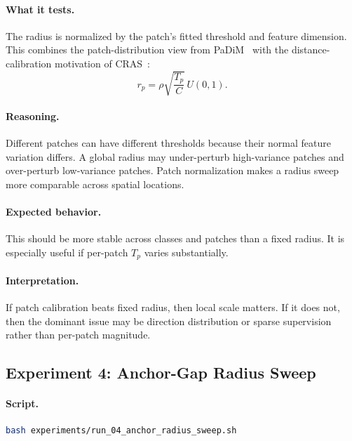 \documentclass[11pt]{article}
\begin{document}
\paragraph{What it tests.}
The radius is normalized by the patch's fitted threshold and feature dimension.
This combines the patch-distribution view from PaDiM~\cite{padim} with the
distance-calibration motivation of CRAS~\cite{cras}:
\begin{equation}
  r_p = \rho \sqrt{\frac{T_p}{C}}\,U(0,1).
\end{equation}

\paragraph{Reasoning.}
Different patches can have different thresholds because their normal feature
variation differs. A global radius may under-perturb high-variance patches and
over-perturb low-variance patches. Patch normalization makes a radius sweep more
comparable across spatial locations.

\paragraph{Expected behavior.}
This should be more stable across classes and patches than a fixed radius. It is
especially useful if per-patch $T_p$ varies substantially.

\paragraph{Interpretation.}
If patch calibration beats fixed radius, then local scale matters. If it does
not, then the dominant issue may be direction distribution or sparse supervision
rather than per-patch magnitude.

\subsection{Experiment 4: Anchor-Gap Radius Sweep}

\paragraph{Script.}
\begin{lstlisting}[language=bash]
bash experiments/run_04_anchor_radius_sweep.sh
\end{lstlisting}
\end{document}
